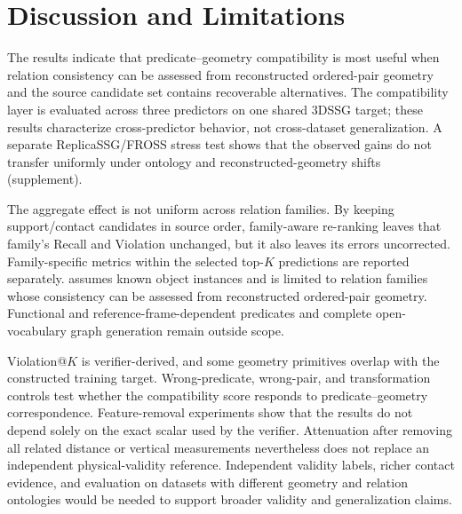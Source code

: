 \section{Discussion and Limitations}

The results indicate that predicate--geometry compatibility is most useful when
relation consistency can be assessed from reconstructed ordered-pair geometry
and the source candidate set contains recoverable alternatives. The
compatibility layer is evaluated across three predictors on one shared 3DSSG
target; these results characterize cross-predictor behavior, not cross-dataset
generalization. A separate ReplicaSSG/FROSS stress test shows that the observed
gains do not transfer uniformly under ontology and reconstructed-geometry shifts
(supplement).

The aggregate effect is not uniform across relation families. By keeping
support/contact candidates in source order, family-aware re-ranking leaves that
family's Recall and Violation unchanged, but it also leaves its errors
uncorrected. Family-specific metrics within the selected top-$K$ predictions
are reported separately. \method{} assumes known object instances and is
limited to relation families whose consistency can be assessed from
reconstructed ordered-pair geometry. Functional and reference-frame-dependent
predicates and complete open-vocabulary graph generation remain outside scope.

Violation@$K$ is verifier-derived, and some geometry primitives overlap with
the constructed training target. Wrong-predicate, wrong-pair, and transformation
controls test whether the compatibility score responds to predicate--geometry
correspondence. Feature-removal experiments show that the results do not depend
solely on the exact scalar used by the verifier. Attenuation after removing all
related distance or vertical measurements nevertheless does not replace an
independent physical-validity reference. Independent validity labels, richer
contact evidence, and evaluation on datasets with different geometry and
relation ontologies would be needed to support broader validity and
generalization claims.
